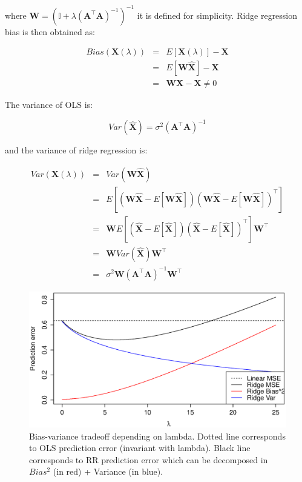 \noindent where $\mathbf{W}  = (\mathbb{I} + \lambda (\mathbf{A}^\top
\mathbf{A})^{-1})^{-1}  $ it is defined for simplicity. Ridge
regression bias is then obtained as:

\begin{eqnarray*}
Bias(\mathbf{X}(\lambda)) &=& E[\mathbf{X}(\lambda)] - \mathbf{X} \\
&=& E[\mathbf{W}\hat{\mathbf{X}}] - \mathbf{X} \\
&=&  \mathbf{W} \mathbf{X} - \mathbf{X} \neq 0 
\end{eqnarray*}


The variance of OLS is:

\begin{equation*}
Var(\hat{\mathbf{X}}) = \sigma^2 (\mathbf{A}^\top \mathbf{A} )^{-1}
\end{equation*}

\noindent and the variance of ridge regression is:

\begin{eqnarray*}
Var(\mathbf{X}(\lambda)) &=& Var(\mathbf{W}\hat{\mathbf{X}}) \\
&=& E[(\mathbf{W}\hat{\mathbf{X}}-E[\mathbf{W}\hat{\mathbf{X}}])(\mathbf{W}\hat{\mathbf{X}}-E[\mathbf{W}\hat{\mathbf{X}}])^\top] \\
&=& \mathbf{W}E[(\hat{\mathbf{X}}-E[\hat{\mathbf{X}}])(\hat{\mathbf{X}}-E[\hat{\mathbf{X}}])^\top] \mathbf{W}^\top \\
&=& \mathbf{W}Var(\hat{\mathbf{X}})\mathbf{W}^\top \\
&=& \sigma^2 \mathbf{W}(\mathbf{A}^\top \mathbf{A} )^{-1}\mathbf{W}^\top
\end{eqnarray*}

\begin{figure}[h!]
\includegraphics[width=\linewidth]{img/biasvariance}
\caption{Bias-variance tradeoff depending on lambda. Dotted line corresponds to OLS prediction error (invariant with lambda). Black line corresponds to RR prediction error which can be decomposed in $Bias^2$ (in red) + Variance (in blue).}
\label{fig:biasvariance}
\end{figure}	


